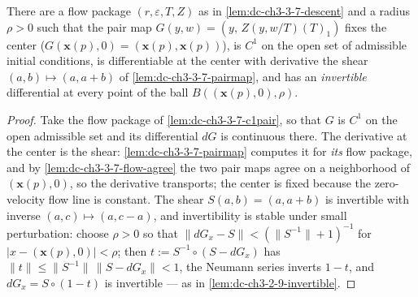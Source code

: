 \begin{lemma}
  \label{lem:dc-ch3-3-7-invertible}


  There are a flow package $(r,\varepsilon,T,Z)$ as in
  \cref{lem:dc-ch3-3-7-descent} and a radius $\rho>0$ such that the pair map
  $G(y,w)=(y,\,Z(y,w/T)(T)_1)$ fixes the center
  ($G(\mathbf{x}(p),0)=(\mathbf{x}(p),\mathbf{x}(p))$), is $C^1$ on the open
  set of admissible initial conditions, is differentiable at the center with
  derivative the shear $(a,b)\mapsto(a,a+b)$ of
  \cref{lem:dc-ch3-3-7-pairmap}, and has an \emph{invertible} differential at
  every point of the ball $B((\mathbf{x}(p),0),\rho)$.
\end{lemma}
\begin{proof}
  \sketch

  Take the flow package of \cref{lem:dc-ch3-3-7-c1pair}, so that $G$ is $C^1$
  on the open admissible set and its differential $dG$ is continuous there.
  The derivative at the center is the shear: \cref{lem:dc-ch3-3-7-pairmap}
  computes it for \emph{its} flow package, and by
  \cref{lem:dc-ch3-3-7-flow-agree} the two pair maps agree on a neighborhood
  of $(\mathbf{x}(p),0)$, so the derivative transports; the center is fixed
  because the zero-velocity flow line is constant. The shear $S(a,b)=(a,a+b)$
  is invertible with inverse $(a,c)\mapsto(a,c-a)$, and invertibility is
  stable under small perturbation: choose $\rho>0$ so that
  $\|dG_x-S\|<(\|S^{-1}\|+1)^{-1}$ for $|x-(\mathbf{x}(p),0)|<\rho$; then
  $t:=S^{-1}\circ(S-dG_x)$ has $\|t\|\le\|S^{-1}\|\,\|S-dG_x\|<1$, the
  Neumann series inverts $1-t$, and $dG_x=S\circ(1-t)$ is invertible — as in
  \cref{lem:dc-ch3-2-9-invertible}.
\end{proof}

